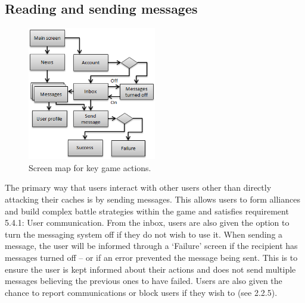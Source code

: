 \subsection{Reading and sending messages}
\begin{figure}
	\vspace{-20pt}
	\begin{center}
	\includegraphics[width=0.5\textwidth]{images/sending_messages}
	\caption{Screen map for key game actions.}
	\end{center}
	\vspace{-20pt}
\end{figure}
The primary way that users interact with other users other than directly attacking their caches is by sending messages. This allows users to form alliances and build complex battle strategies within the game and satisfies requirement 5.4.1: User communication. From the inbox, users are also given the option to turn the messaging system off if they do not wish to use it. When sending a message, the user will be informed through a ‘Failure’ screen if the recipient has messages turned off – or if an error prevented the message being sent. This is to ensure the user is kept informed about their actions and does not send multiple messages believing the previous ones to have failed. Users are also given the chance to report communications or block users if they wish to (see 2.2.5).

